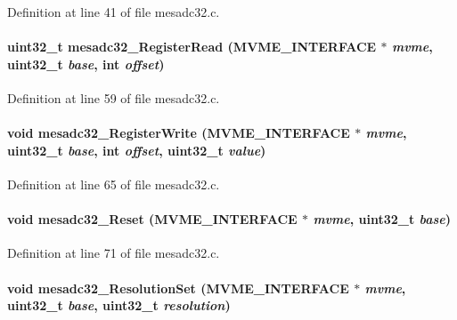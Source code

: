 Definition at line 41 of file mesadc32.c.
\paragraph[{mesadc32\_\-RegisterRead}]{\setlength{\rightskip}{0pt plus 5cm}uint32\_\-t mesadc32\_\-RegisterRead ({\bf MVME\_\-INTERFACE} $\ast$ {\em mvme}, \/  uint32\_\-t {\em base}, \/  int {\em offset})}\hfill\label{mesadc32_8c_ab5b82559a468ceeb22bd83389cd27949}


Definition at line 59 of file mesadc32.c.
\paragraph[{mesadc32\_\-RegisterWrite}]{\setlength{\rightskip}{0pt plus 5cm}void mesadc32\_\-RegisterWrite ({\bf MVME\_\-INTERFACE} $\ast$ {\em mvme}, \/  uint32\_\-t {\em base}, \/  int {\em offset}, \/  uint32\_\-t {\em value})}\hfill\label{mesadc32_8c_a9da90e21c1532568a68ff3637651d0c2}


Definition at line 65 of file mesadc32.c.
\paragraph[{mesadc32\_\-Reset}]{\setlength{\rightskip}{0pt plus 5cm}void mesadc32\_\-Reset ({\bf MVME\_\-INTERFACE} $\ast$ {\em mvme}, \/  uint32\_\-t {\em base})}\hfill\label{mesadc32_8c_a0309180bd402fd35da4398d9b9520f8a}


Definition at line 71 of file mesadc32.c.
\paragraph[{mesadc32\_\-ResolutionSet}]{\setlength{\rightskip}{0pt plus 5cm}void mesadc32\_\-ResolutionSet ({\bf MVME\_\-INTERFACE} $\ast$ {\em mvme}, \/  uint32\_\-t {\em base}, \/  uint32\_\-t {\em resolution})}\hfill\label{mesadc32_8c_ac5648104d8f53c0d467811b31e9c0886}


